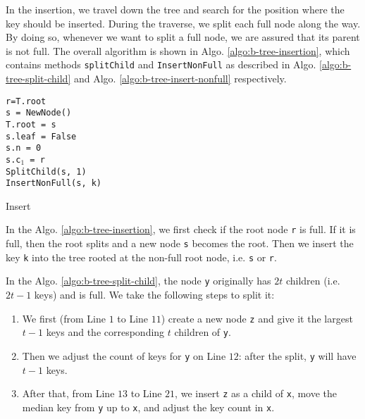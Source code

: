 In the insertion, we travel down the tree and search for the position where the key should be inserted. During the traverse, we split each full node along the way. By doing so, whenever we want to split a full node, we are assured that its parent is not full. The overall algorithm is shown in Algo. \ref{algo:b-tree-insertion}, which contains methods \texttt{splitChild} and \texttt{InsertNonFull} as described in Algo. \ref{algo:b-tree-split-child} and Algo. \ref{algo:b-tree-insert-nonfull} respectively.

\begin{algorithm}[H]
\SetAlgoLined
{}
	\texttt{r=T.root} \\
  {
  \texttt{s = NewNode()} \\
  \texttt{T.root = s} \\
  \texttt{s.leaf = False} \\
  \texttt{s.n = 0} \\
  \texttt{s.c$_1$ = r} \\
  \texttt{SplitChild(s, 1)} \\
  \texttt{InsertNonFull(s, k)} \\
 }
 \caption{Insert}
 \label{algo:b-tree-insertion}
\end{algorithm}

In the Algo. \ref{algo:b-tree-insertion}, we first check if the root node \texttt{r} is full. If it is full, then the root splits and a new node \texttt{s} becomes the root. Then we insert the key \texttt{k} into the tree rooted at the non-full root node, i.e. \texttt{s} or \texttt{r}.

In the Algo. \ref{algo:b-tree-split-child}, the node \texttt{y} originally has $2t$ children (i.e. $2t-1$ keys) and is full. We take the following steps to split it:

\begin{enumerate}
	\item We first (from Line $1$ to Line $11$) create a new node \texttt{z} and give it the largest $t-1$ keys and the corresponding $t$ children of \texttt{y}.
	\item Then we adjust the count of keys for \texttt{y} on Line $12$: after the split, \texttt{y} will have $t-1$ keys.
	\item After that, from Line $13$ to Line $21$, we insert \texttt{z} as a child of \texttt{x}, move the median key from \texttt{y} up to \texttt{x}, and adjust the key count in \texttt{x}.
\end{enumerate}

